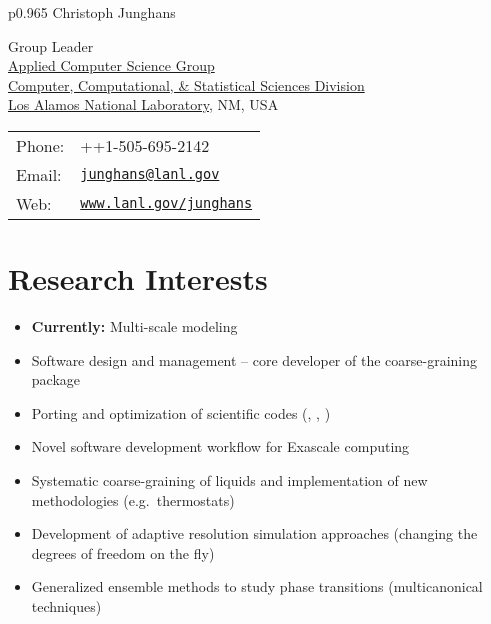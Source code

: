\documentclass{article}
\begin{document}
\thispagestyle{plain}
\vspace*{-1.2cm}

\begin{tabular}{p{0.965\textwidth}}
{\huge Christoph Junghans}\\
\hline
\end{tabular}
\vspace{0.2in}

\begin{minipage}{0.55\linewidth}
  Group Leader\\ 
  \href{https://www.lanl.gov/org/ddste/aldsc/computer-computational-statistical-sciences/applied-computer-science/index.php}{Applied Computer Science Group}\\
  \href{https://www.lanl.gov/org/ddste/aldsc/computer-computational-statistical-sciences/index.php}{Computer, Computational, \& Statistical Sciences Division}\\
  \href{http://www.lanl.gov}{Los Alamos National Laboratory}, NM, USA
\end{minipage}
\begin{minipage}{0.45\linewidth}
  \begin{tabular}{ll}
    Phone: & ++1-505-695-2142 \\
    Email: & \href{mailto:junghans@lanl.gov}{\tt junghans@lanl.gov} \\
    Web: & \href{http://www.lanl.gov/junghans}{\tt www.lanl.gov/junghans} \\
  \end{tabular}
\end{minipage}

\section*{Research Interests}
\begin{itemize}
\setlength{\itemsep}{0pt}
\setlength{\parskip}{0pt}
\setlength{\parsep}{0pt}
\item \textbf{Currently:} Multi-scale modeling
\item Software design and management -- core developer of the coarse-graining package 
\item Porting and optimization of scientific codes (, , )
\item Novel software development workflow for Exascale computing
\item Systematic coarse-graining of liquids and implementation of new methodologies (e.g.\ thermostats)
\item Development of adaptive resolution simulation approaches (changing the degrees of freedom on the fly)
\item Generalized ensemble methods to study phase transitions (multicanonical techniques)
\end{itemize}
\end{document}
